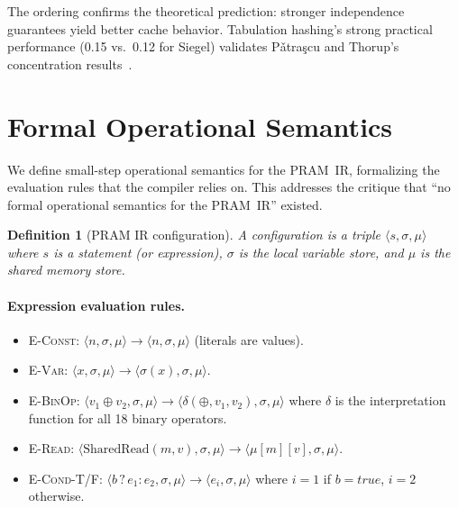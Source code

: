 \documentclass[11pt]{article}
\newtheorem{definition}[theorem]{Definition}
\begin{document}
The ordering confirms the theoretical prediction: stronger independence
guarantees yield better cache behavior.  Tabulation hashing's strong
practical performance (0.15 vs.\ 0.12 for Siegel) validates
P\v{a}tra\c{s}cu and Thorup's concentration results~\cite{patrascu2012power}.

\section{Formal Operational Semantics}
\label{sec:semantics}

We define small-step operational semantics for the PRAM~IR, formalizing
the evaluation rules that the compiler relies on.  This addresses the
critique that ``no formal operational semantics for the PRAM~IR'' existed.

\begin{definition}[PRAM IR configuration]
A \emph{configuration} is a triple $\langle s, \sigma, \mu \rangle$ where
$s$ is a statement (or expression), $\sigma$ is the local variable store,
and $\mu$ is the shared memory store.
\end{definition}

\paragraph{Expression evaluation rules.}
\begin{itemize}[leftmargin=*]
\item \textsc{E-Const}: $\langle n, \sigma, \mu \rangle \to \langle n, \sigma, \mu \rangle$ (literals are values).
\item \textsc{E-Var}: $\langle x, \sigma, \mu \rangle \to \langle \sigma(x), \sigma, \mu \rangle$.
\item \textsc{E-BinOp}: $\langle v_1 \oplus v_2, \sigma, \mu \rangle \to \langle \delta(\oplus, v_1, v_2), \sigma, \mu \rangle$ where $\delta$ is the interpretation function for all 18 binary operators.
\item \textsc{E-Read}: $\langle \text{SharedRead}(m, v), \sigma, \mu \rangle \to \langle \mu[m][v], \sigma, \mu \rangle$.
\item \textsc{E-Cond-T/F}: $\langle b \mathbin{?} e_1 : e_2, \sigma, \mu \rangle \to \langle e_i, \sigma, \mu \rangle$ where $i = 1$ if $b = \mathit{true}$, $i = 2$ otherwise.
\end{itemize}
\end{document}
